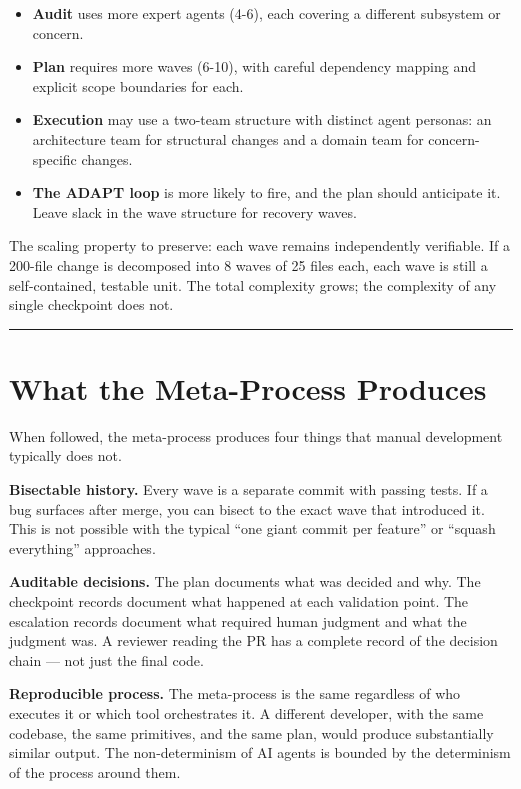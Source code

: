 \documentclass[
  a4paper,
  DIV=11,
  numbers=noendperiod]{scrreprt}
\providecommand{\tightlist}{%
  \setlength{\itemsep}{0pt}\setlength{\parskip}{0pt}}
\begin{document}
\begin{itemize}
\tightlist
\item
  \textbf{Audit} uses more expert agents (4-6), each covering a
  different subsystem or concern.
\item
  \textbf{Plan} requires more waves (6-10), with careful dependency
  mapping and explicit scope boundaries for each.
\item
  \textbf{Execution} may use a two-team structure with distinct agent
  personas: an architecture team for structural changes and a domain
  team for concern-specific changes.
\item
  \textbf{The ADAPT loop} is more likely to fire, and the plan should
  anticipate it. Leave slack in the wave structure for recovery waves.
\end{itemize}

The scaling property to preserve: each wave remains independently
verifiable. If a 200-file change is decomposed into 8 waves of 25 files
each, each wave is still a self-contained, testable unit. The total
complexity grows; the complexity of any single checkpoint does not.

\begin{center}\rule{0.5\linewidth}{0.5pt}\end{center}

\section{What the Meta-Process
Produces}\label{what-the-meta-process-produces}

When followed, the meta-process produces four things that manual
development typically does not.

\textbf{Bisectable history.} Every wave is a separate commit with
passing tests. If a bug surfaces after merge, you can bisect to the
exact wave that introduced it. This is not possible with the typical
``one giant commit per feature'' or ``squash everything'' approaches.

\textbf{Auditable decisions.} The plan documents what was decided and
why. The checkpoint records document what happened at each validation
point. The escalation records document what required human judgment and
what the judgment was. A reviewer reading the PR has a complete record
of the decision chain --- not just the final code.

\textbf{Reproducible process.} The meta-process is the same regardless
of who executes it or which tool orchestrates it. A different developer,
with the same codebase, the same primitives, and the same plan, would
produce substantially similar output. The non-determinism of AI agents
is bounded by the determinism of the process around them.
\end{document}
